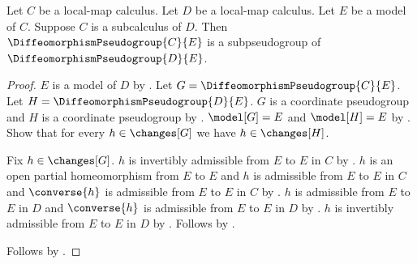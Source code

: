 \begin{theorem}\label{subcalculus_pseudogroup}
    Let $C$ be a local-map calculus.
    Let $D$ be a local-map calculus.
    Let $E$ be a model of $C$.
    Suppose $C$ is a subcalculus of $D$.
    Then $\DiffeomorphismPseudogroup{C}{E}$ is a subpseudogroup of
        $\DiffeomorphismPseudogroup{D}{E}$.
\end{theorem}
\begin{proof}
    $E$ is a model of $D$ by .
    Let $G=\DiffeomorphismPseudogroup{C}{E}$.
    Let $H=\DiffeomorphismPseudogroup{D}{E}$.
    $G$ is a coordinate pseudogroup and $H$ is a coordinate pseudogroup by
        .
    $\model[G]=E$ and $\model[H]=E$ by .
    Show that for every $h\in\changes[G]$ we have $h\in\changes[H]$.
    \begin{subproof}
        Fix $h\in\changes[G]$.
        $h$ is invertibly admissible from $E$ to $E$ in $C$ by
            .
        $h$ is an open partial homeomorphism from $E$ to $E$ and
            $h$ is admissible from $E$ to $E$ in $C$ and
            $\converse{h}$ is admissible from $E$ to $E$ in $C$ by
            .
        $h$ is admissible from $E$ to $E$ in $D$ and
            $\converse{h}$ is admissible from $E$ to $E$ in $D$ by
            .
        $h$ is invertibly admissible from $E$ to $E$ in $D$ by
            .
        Follows by .
    \end{subproof}
    Follows by .
\end{proof}


